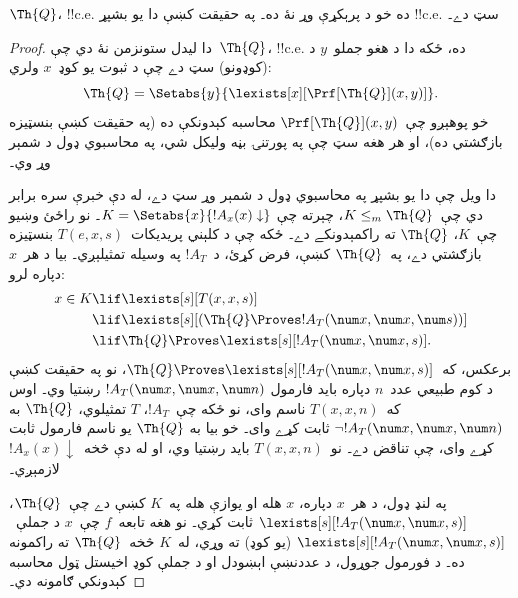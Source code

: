 \documentclass[../../../include/open-logic-section]{subfiles}
\begin{document}



\begin{thm}
$\Th{Q}$، !!{c.e.} ده خو د پرېکړې وړ نۀ ده۔ په حقيقت کښې دا يو
بشپړ !!{c.e.} سټ دے۔
\end{thm}

\begin{proof}
دا ليدل ستونزمن نۀ دي چې~$\Th{Q}$، !!{c.e.} ده، ځکه دا د هغو
جملو~$y$ د (کوډونو) سټ دے چې د ثبوت يو کوډ~$x$ ولري:
\[
\Th{Q} = \Setabs{y}{\lexists[x][\Prf[\Th{Q}](x,y)]}.
\]
خو پوهېږو چې~$\Prf[\Th{Q}](x,y)$ محاسبه کېدونکې ده (په حقيقت کښې
بنسټيزه بازګشتي ده)، او هر هغه سټ چې په پورتنۍ بڼه وليکل شي، په
محاسبوي ډول د شمېر وړ وي۔

دا ويل چې دا يو بشپړ په محاسبوي ډول د شمېر وړ سټ دے، له دې خبرې
سره برابر دي چې~$K \leq_m \Th{Q}$، چېرته چې
$K = \Setabs{x}{!A_x(x) \downarrow}$۔ نو راځئ وښيو چې~$K$،
$\Th{Q}$ ته راکمېدونکے دے۔ ځکه چې د کلېني پريديکات~$T(e,x,s)$
بنسټيزه بازګشتي دے، په~$\Th{Q}$ کښې، فرض کړئ، د~$!A_T$ په وسيله
تمثيلېږي۔ بيا د هر~$x$ دپاره لرو:
\begin{align*}
x \in K & \lif \lexists[s][T(x,x,s)] \\
& \lif \lexists[s][(\Th{Q} \Proves !A_T(\num x,\num x, \num s))]
  \\
& \lif \Th{Q} \Proves \lexists[s][!A_T(\num x, \num x, s)].
\end{align*}
برعکس، که~$\Th{Q} \Proves \lexists[s][!A_T(\num x, \num x, s)]$،
نو په حقيقت کښې د کوم طبيعي عدد~$n$ دپاره بايد فارمول
$!A_T(\num x, \num x, \num n)$ رښتيا وي۔ اوس که~$T(x,x,n)$ ناسم
وای، نو ځکه چې~$!A_T$، $T$ تمثيلوي، $\Th{Q}$ به
$\lnot !A_T(\num x, \num x, \num n)$ ثابت کړے وای۔ خو بيا به
$\Th{Q}$ يو ناسم فارمول ثابت کړے وای، چې تناقض دے۔ نو~$T(x,x,n)$
بايد رښتيا وي، او له دې څخه~$!A_x(x) \downarrow$ لازمېږي۔

په لنډ ډول، د هر~$x$ دپاره، $x$ هله او يوازې هله په~$K$ کښې دے
چې~$\Th{Q}$، $\lexists[s][!A_T(\num x,\num x,s)]$ ثابت کړي۔ نو هغه
تابعه~$f$ چې~$x$ د جملې~$\lexists[s][!A_T(\num x,
  \num x, s)]$ (يو کوډ) ته وړي، له~$K$ څخه~$\Th{Q}$ ته راکمونه ده۔ د فورمول جوړول، د عددنښې اېښودل او د جملې کوډ اخيستل ټول محاسبه کېدونکي ګامونه دي۔
\end{proof}
\end{document}
